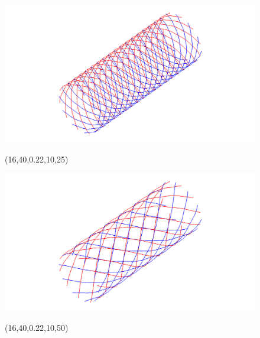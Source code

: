 \begin{figure} [H]
\begin{latexonly}
\begin{minipage} [c] [] [c] {5.5cm}
\end{minipage}
\hspace{0.3cm}
\hspace{0.1cm}
	\begin{minipage} [c] [] [c]{5.5cm} 
	\includegraphics [width =\textwidth] {images/WireStentD16L40d22n10b25}
	\begin{center}
	\vspace{-3ex}
	(16,40,0.22,10,25)
	\vspace{1ex}
	\end{center}
\end{minipage}
\hspace{0.3cm}
\begin{minipage} [c] [] [c] {5.5cm}
	\includegraphics [width =\textwidth] {images/WireStentD16L40d22n10b50}
	\begin{center}
	\vspace{-3ex}
	(16,40,0.22,10,50)
	\vspace{1ex}
	\end{center}
\end{minipage}
\hspace{0.3cm}
\hspace{0.1cm}

\end{latexonly}
\end{figure}
